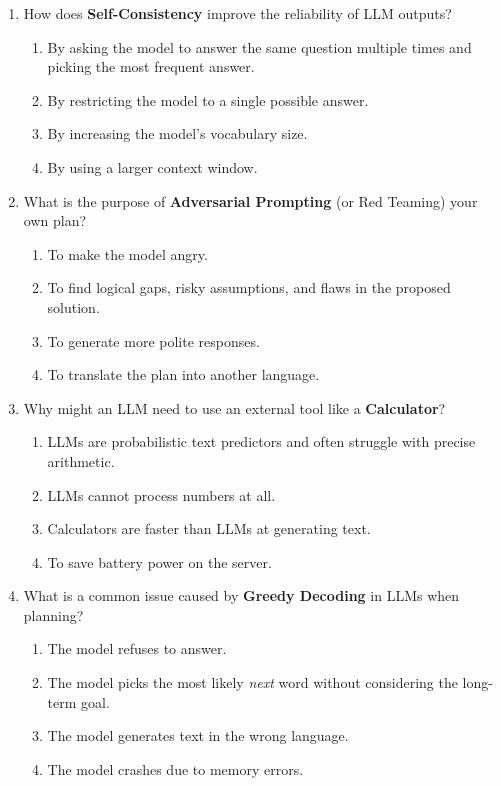 \documentclass[11pt,a4paper]{article}
\begin{document}
\begin{enumerate}[leftmargin=*, label=\textbf{\#\arabic*}]
  \item How does \textbf{Self-Consistency} improve the reliability of LLM outputs?
    \begin{enumerate}[label=\Alph*)]
      \item By asking the model to answer the same question multiple times and picking the most frequent answer.
      \item By restricting the model to a single possible answer.
      \item By increasing the model's vocabulary size.
      \item By using a larger context window.
    \end{enumerate}

  \item What is the purpose of \textbf{Adversarial Prompting} (or Red Teaming) your own plan?
    \begin{enumerate}[label=\Alph*)]
      \item To make the model angry.
      \item To find logical gaps, risky assumptions, and flaws in the proposed solution.
      \item To generate more polite responses.
      \item To translate the plan into another language.
    \end{enumerate}

  \item Why might an LLM need to use an external tool like a \textbf{Calculator}?
    \begin{enumerate}[label=\Alph*)]
      \item LLMs are probabilistic text predictors and often struggle with precise arithmetic.
      \item LLMs cannot process numbers at all.
      \item Calculators are faster than LLMs at generating text.
      \item To save battery power on the server.
    \end{enumerate}

  \item What is a common issue caused by \textbf{Greedy Decoding} in LLMs when planning?
    \begin{enumerate}[label=\Alph*)]
      \item The model refuses to answer.
      \item The model picks the most likely \textit{next} word without considering the long-term goal.
      \item The model generates text in the wrong language.
      \item The model crashes due to memory errors.
    \end{enumerate}

\end{enumerate}
\end{document}
